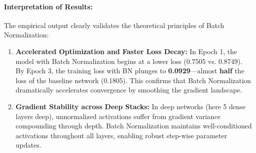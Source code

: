 \documentclass[12pt,a4paper]{article}
\begin{document}
\paragraph{Interpretation of Results:}
The empirical output clearly validates the theoretical principles of Batch Normalization:
\begin{enumerate}[leftmargin=*]
    \item \textbf{Accelerated Optimization and Faster Loss Decay:} In Epoch 1, the model with Batch Normalization begins at a lower loss (0.7505 vs. 0.8749). By Epoch 3, the training loss with BN plunges to \textbf{0.0929}—almost \textbf{half} the loss of the baseline network (0.1805). This confirms that Batch Normalization dramatically accelerates convergence by smoothing the gradient landscape.
    \item \textbf{Gradient Stability across Deep Stacks:} In deep networks (here 5 dense layers deep), unnormalized activations suffer from gradient variance compounding through depth. Batch Normalization maintains well-conditioned activations throughout all layers, enabling robust step-wise parameter updates.
\end{enumerate}
\end{document}
